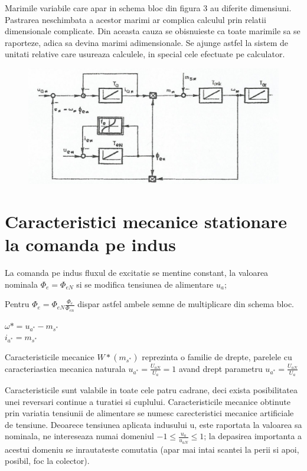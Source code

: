\documentclass[11pt]{article}
\begin{document}
Marimile variabile care apar in schema bloc din figura 3 au diferite dimensiuni. Pastrarea neschimbata a acestor marimi ar complica calculul prin relatii dimensionale complicate. Din aceasta cauza se obisnuieste ca toate marimile sa se raporteze, adica sa devina marimi adimensionale. Se ajunge astfel la sistem de unitati relative care usureaza calculele, in special cele efectuate pe calculator.
\begin{figure}[H]
	\centering
	\includegraphics[width=.8\linewidth]{fig5.png}
	\label{fig:test2}
\end{figure}
\section{Caracteristici mecanice stationare la comanda pe indus}
La comanda pe indus fluxul de excitatie se mentine constant, la valoarea nominala $\Phi_e=\Phi_{eN}$ si se modifica tensiunea de alimentare $u_a$;

Pentru $\Phi_e=\Phi_{eN}\frac{\Phi_{e}}{\Phi_{en}}$ dispar astfel ambele semne de multiplicare din schema bloc.
\begin{center}
	$\omega*=u_{a^*}-m_{s^*}$\\
	$i_{a^*}=m_{s^*}$
\end{center}
Caracteristicile mecanice $W* (m_{s^*})$ reprezinta o familie de drepte, parelele cu 
caracteriastica mecanica naturala $u_{a^*}=\frac{U_{aN}}{U_a}=1$ avand drept parametru $u_{a^*}=\frac{U_{aN}}{U_a}$

Caracteristicile sunt valabile in toate cele patru cadrane, deci exista posibilitatea unei reversari continue a turatiei si cuplului. Caracteristicile mecanice obtinute prin variatia tensiunii de alimentare se numesc carecteristici mecanice artificiale de tensiune. Deoarece tensiunea aplicata indusului u, este raportata la valoarea sa nominala, ne intereseaza numai domeniul $-1 \leq \frac{u_a}{u_{aN}} \leq 1$; la depasirea importanta a acestui domeniu se inrautateste 
comutatia (apar mai intai scantei la perii si apoi, posibil, foc la colector). 
\end{document}
